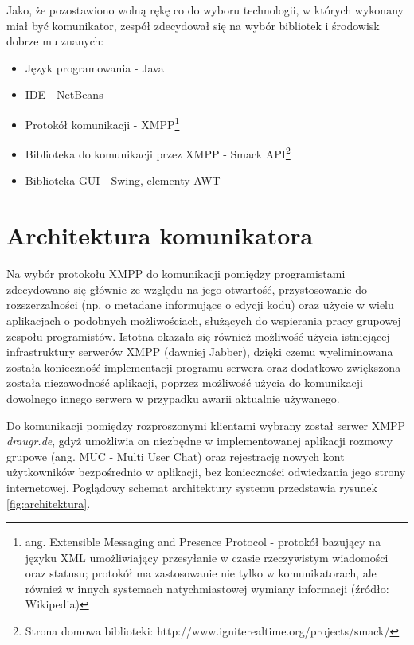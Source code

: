 \documentclass[polish,11pt,a4paper,twoside]{article}
\begin{document}
Jako, że pozostawiono wolną rękę co do wyboru technologii, w których wykonany miał być komunikator, zespół zdecydował się na wybór bibliotek i środowisk dobrze mu znanych:
\begin{itemize}
\item Język programowania - Java
\item IDE - NetBeans
\item Protokół komunikacji - XMPP\footnote{ang. Extensible Messaging and Presence Protocol - protokół bazujący na języku XML umożliwiający przesyłanie w czasie rzeczywistym wiadomości oraz statusu; protokół ma zastosowanie nie tylko w komunikatorach, ale również w innych systemach natychmiastowej wymiany informacji (źródło: Wikipedia)}
\item Biblioteka do komunikacji przez XMPP - Smack API\footnote{Strona domowa biblioteki: http://www.igniterealtime.org/projects/smack/}
\item Biblioteka GUI - Swing, elementy AWT
\end{itemize}

\section{Architektura komunikatora}

Na wybór protokołu XMPP do komunikacji pomiędzy programistami zdecydowano się głównie ze względu na jego otwartość, przystosowanie do rozszerzalności (np. o metadane informujące o edycji kodu) oraz użycie w wielu aplikacjach o podobnych możliwościach, służących do wspierania pracy grupowej zespołu programistów. Istotna okazała się również możliwość użycia istniejącej infrastruktury serwerów XMPP (dawniej Jabber), dzięki czemu wyeliminowana została konieczność implementacji programu serwera oraz dodatkowo zwiększona została niezawodność aplikacji, poprzez możliwość użycia do komunikacji dowolnego innego serwera w przypadku awarii aktualnie używanego.

Do komunikacji pomiędzy rozproszonymi klientami wybrany został serwer XMPP \emph{draugr.de}, gdyż umożliwia on niezbędne w implementowanej aplikacji rozmowy grupowe (ang. MUC - Multi User Chat) oraz rejestrację nowych kont użytkowników bezpośrednio w aplikacji, bez konieczności odwiedzania jego strony internetowej. Poglądowy schemat architektury systemu przedstawia rysunek \ref{fig:architektura}.
\end{document}
